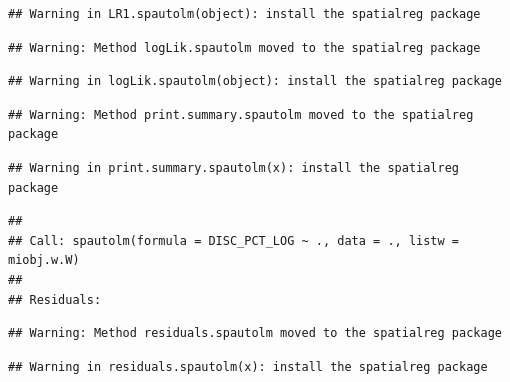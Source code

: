 \documentclass[11pt,]{article}
\begin{document}
\begin{verbatim}
## Warning in LR1.spautolm(object): install the spatialreg package
\end{verbatim}

\begin{verbatim}
## Warning: Method logLik.spautolm moved to the spatialreg package
\end{verbatim}

\begin{verbatim}
## Warning in logLik.spautolm(object): install the spatialreg package
\end{verbatim}

\begin{verbatim}
## Warning: Method print.summary.spautolm moved to the spatialreg package
\end{verbatim}

\begin{verbatim}
## Warning in print.summary.spautolm(x): install the spatialreg package
\end{verbatim}

\begin{verbatim}
## 
## Call: spautolm(formula = DISC_PCT_LOG ~ ., data = ., listw = miobj.w.W)
## 
## Residuals:
\end{verbatim}

\begin{verbatim}
## Warning: Method residuals.spautolm moved to the spatialreg package
\end{verbatim}

\begin{verbatim}
## Warning in residuals.spautolm(x): install the spatialreg package
\end{verbatim}
\end{document}
